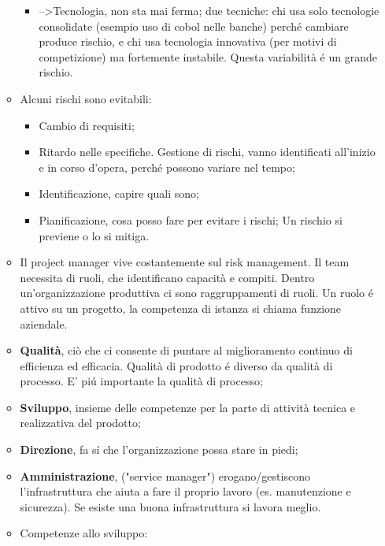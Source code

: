 \documentclass[a4paper,10pt] {article}
\begin{document}
\begin{itemize}
\begin{itemize}
\begin{itemize}
		\item -->Tecnologia, non sta mai ferma; due tecniche: chi usa solo 
		tecnologie consolidate (esempio uso di cobol nelle banche) perché 
		cambiare produce rischio, e chi usa tecnologia 
		innovativa (per motivi di competizione) ma fortemente instabile. Questa 
		variabilità é un grande rischio.
	\end{itemize}
		\item Alcuni rischi sono evitabili:
		\begin{itemize}
		\item Cambio di requisiti;
		
		\item Ritardo nelle specifiche.
		Gestione di rischi, vanno identificati all'inizio e in corso d'opera, 
		perché possono variare nel tempo; 
		
		\item Identificazione, capire quali sono;
		
		\item Pianificazione, cosa posso fare per evitare i rischi;
		Un rischio si previene o lo si mitiga.	
		\end{itemize}
		


\item Il project manager vive costantemente sul risk management.
Il team necessita di ruoli, che identificano capacità e compiti. Dentro 
un'organizzazione produttiva ci sono raggruppamenti di ruoli. Un ruolo é 
attivo su un progetto, la competenza di istanza si chiama funzione aziendale.

\item \textbf{Qualità}, ciò che ci consente di puntare al miglioramento 
continuo di efficienza ed efficacia. Qualità di prodotto é diverso da 
qualità di processo. E' pi\'u importante la qualità di 
processo;

\item \textbf{Sviluppo}, insieme delle competenze per la parte di attività 
tecnica e realizzativa del prodotto;

\item \textbf{Direzione}, fa s\'i che l'organizzazione possa stare in piedi;

\item \textbf{Amministrazione}, ("service manager") erogano/gestiscono 
l'infrastruttura che aiuta a fare il proprio lavoro (es. manutenzione e 
sicurezza). Se esiste una buona infrastruttura si 
lavora meglio.


	\item Competenze allo sviluppo:
	\begin{itemize}
		

\end{itemize}
\end{itemize}
\end{itemize}
\end{document}
